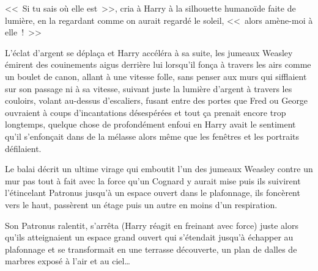 <<~Si tu sais où elle est~>>, cria à Harry à la silhouette humanoïde faite de lumière, en la regardant comme on aurait regardé le soleil, <<~alors amène-moi à elle~!~>>

L'éclat d'argent se déplaça et Harry accéléra à sa suite, les jumeaux Weasley émirent des couinements aigus derrière lui lorsqu'il fonça à travers les airs comme un boulet de canon, allant à une vitesse folle, sans penser aux murs qui sifflaient sur son passage ni à sa vitesse, suivant juste la lumière d'argent à travers les couloirs, volant au-dessus d'escaliers, fusant entre des portes que Fred ou George ouvraient à coups d'incantations désespérées et tout ça prenait encore trop longtemps, quelque chose de profondément enfoui en Harry avait le sentiment qu'il s'enfonçait dans de la mélasse alors même que les fenêtres et les portraits défilaient.

Le balai décrit un ultime virage qui emboutit l'un des jumeaux Weasley contre un mur pas tout à fait avec la force qu'un Cognard y aurait mise puis ils suivirent l'étincelant Patronus jusqu'à un espace ouvert dans le plafonnage, ils foncèrent vers le haut, passèrent un étage puis un autre en moins d'un respiration.

Son Patronus ralentit, s'arrêta (Harry réagit en freinant avec force) juste alors qu'ils atteignaient un espace grand ouvert qui s'étendait jusqu'à échapper au plafonnage et se transformait en une terrasse découverte, un plan de dalles de marbres exposé à l'air et au ciel… 

